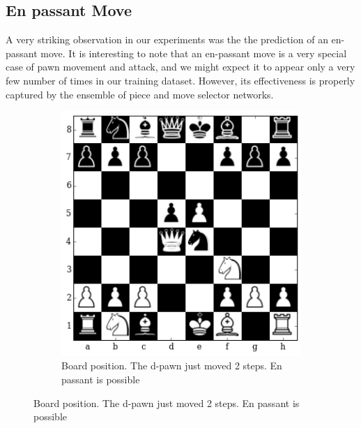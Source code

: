 \subsection{En passant Move}
A very striking observation in our experiments was the the prediction of an 
en-passant move. It is interesting to note that an en-passant move is a very 
special case of  pawn movement and attack, and we might expect it to appear 
only a very few number of times in our training dataset. However, its 
effectiveness is properly captured by the ensemble of piece and move selector 
networks.
\begin{figure}[H]
\hspace*{-0.5in}  
  \centering
    \begin{subfigure}[t]{\textwidth}
        \centering
        \includegraphics[scale=0.65]{img/best_moves/output_38_0.png}
        \caption{Board position. The d-pawn just moved 2 steps. En passant is 
possible}
    \end{subfigure}%


\end{figure}
